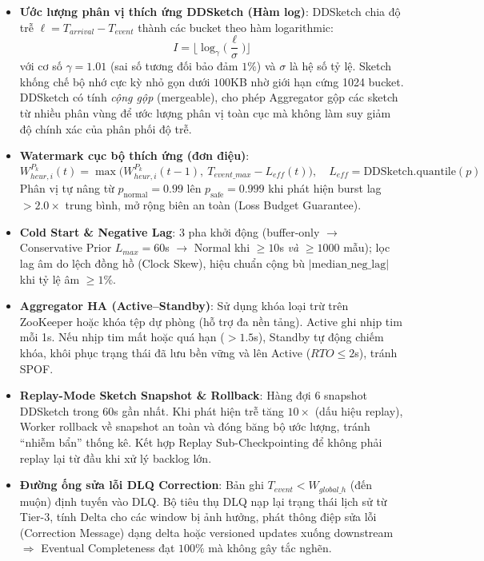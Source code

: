 \documentclass[9pt,a4paper]{article}
\begin{document}
\begin{itemize}[leftmargin=*]
    \item \textbf{Ước lượng phân vị thích ứng DDSketch (Hàm log)}: DDSketch chia độ trễ $\ell = T_{arrival} - T_{event}$ thành các bucket theo hàm logarithmic:
    \begin{equation}
    I = \Big\lfloor \log_{\gamma}\Big(\frac{\ell}{\sigma}\Big) \Big\rfloor
    \end{equation}
    với cơ số $\gamma = 1.01$ (sai số tương đối bảo đảm $1\%$) và $\sigma$ là hệ số tỷ lệ. Sketch khống chế bộ nhớ cực kỳ nhỏ gọn dưới $100$KB nhờ giới hạn cứng 1024 bucket. DDSketch có tính \emph{cộng gộp} (mergeable), cho phép Aggregator gộp các sketch từ nhiều phân vùng để ước lượng phân vị toàn cục mà không làm suy giảm độ chính xác của phân phối độ trễ.
    \item \textbf{Watermark cục bộ thích ứng (đơn điệu)}:
    {\large
    \begin{equation}
    \boxed{W_{heur,i}^{P_k}(t) = \max\Big(W_{heur,i}^{P_k}(t{-}1),\ T_{event\_max} - L_{eff}(t)\Big),\quad L_{eff}=\text{DDSketch.quantile}(p)}
    \end{equation}
    }
    Phân vị tự nâng từ $p_{\text{normal}}=0.99$ lên $p_{\text{safe}}=0.999$ khi phát hiện burst lag $>2.0\times$ trung bình, mở rộng biên an toàn (Loss Budget Guarantee).
    \item \textbf{Cold Start \& Negative Lag}: 3 pha khởi động (buffer-only $\to$ Conservative Prior $L_{max}=60$s $\to$ Normal khi $\ge 10$s \emph{và} $\ge 1000$ mẫu); lọc lag âm do lệch đồng hồ (Clock Skew), hiệu chuẩn cộng bù $|\text{median\_neg\_lag}|$ khi tỷ lệ âm $\ge 1\%$.
    \item \textbf{Aggregator HA (Active--Standby)}: Sử dụng khóa loại trừ trên ZooKeeper hoặc khóa tệp dự phòng (hỗ trợ đa nền tảng). Active ghi nhịp tim mỗi 1s. Nếu nhịp tim mất hoặc quá hạn ($>1.5$s), Standby tự động chiếm khóa, khôi phục trạng thái đã lưu bền vững và lên Active ($RTO\le 2$s), tránh SPOF.
    \item \textbf{Replay-Mode Sketch Snapshot \& Rollback}: Hàng đợi 6 snapshot DDSketch trong 60s gần nhất. Khi phát hiện trễ tăng $10\times$ (dấu hiệu replay), Worker rollback về snapshot an toàn và đóng băng bộ ước lượng, tránh ``nhiễm bẩn'' thống kê. Kết hợp Replay Sub-Checkpointing để không phải replay lại từ đầu khi xử lý backlog lớn.
    \item \textbf{Đường ống sửa lỗi DLQ Correction}: Bản ghi $T_{event}<W_{global\_h}$ (đến muộn) định tuyến vào DLQ. Bộ tiêu thụ DLQ nạp lại trạng thái lịch sử từ Tier-3, tính Delta cho các window bị ảnh hưởng, phát thông điệp sửa lỗi (Correction Message) dạng delta hoặc versioned updates xuống downstream $\Rightarrow$ Eventual Completeness đạt $100\%$ mà không gây tắc nghẽn.
\end{itemize}
\end{document}
